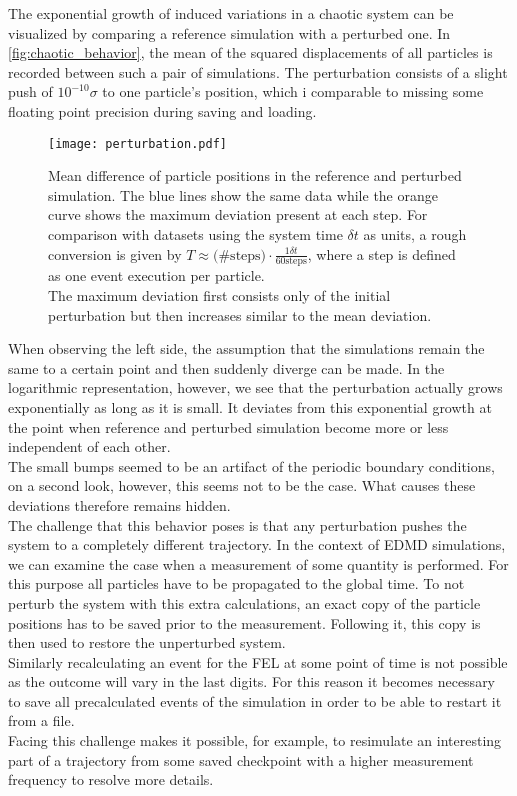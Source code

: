 The exponential growth of induced variations in a chaotic system can be visualized by comparing a reference simulation with a perturbed one. In \autoref{fig:chaotic_behavior}, the mean of the squared displacements of all particles is recorded between such a pair of simulations. The perturbation consists of a slight push of $10^{-10} \sigma$ to one particle's position, which i comparable to missing some floating point precision during saving and loading.\\

\begin{figure}[h]
\centering
\texttt{[image: perturbation.pdf]}
\caption[Exponential growth of perturbations in chaotic system]{Mean difference of particle positions in the reference and perturbed simulation. The blue lines show the same data while the orange curve shows the maximum deviation present at each step. For comparison with datasets using the system time $\delta t$ as units, a rough conversion is given by $T \approx \text{(\#steps)} \cdot \frac{1 \delta t}{60 \text{steps}}$, where a step is defined as one event execution per particle.\\ The maximum deviation first consists only of the initial perturbation but then increases similar to the mean deviation.}
\label{fig:chaotic_behavior}
\end{figure}

When observing the left side, the assumption that the simulations remain the same to a certain point and then suddenly diverge can be made. In the logarithmic representation, however, we see that the perturbation actually grows exponentially as long as it is small. It deviates from this exponential growth at the point when reference and perturbed simulation become more or less independent of each other.\\
The small bumps seemed to be an artifact of the periodic boundary conditions, on a second look, however, this seems not to be the case. What causes these deviations therefore remains hidden.\\

The challenge that this behavior poses is that any perturbation pushes the system to a completely different trajectory. In the context of EDMD simulations, we can examine the case when a measurement of some quantity is performed. For this purpose all particles have to be propagated to the global time. To not perturb the system with this extra calculations, an exact copy of the particle positions has to be saved prior to the measurement. Following it, this copy is then used to restore the unperturbed system.\\ 
Similarly recalculating an event for the FEL at some point of time is not possible as the outcome will vary in the last digits. For this reason it becomes necessary to save all precalculated events of the simulation in order to be able to restart it from a file.\\
Facing this challenge makes it possible, for example, to resimulate an interesting part of a trajectory from some saved checkpoint with a higher measurement frequency to resolve more details. 
\newpage
